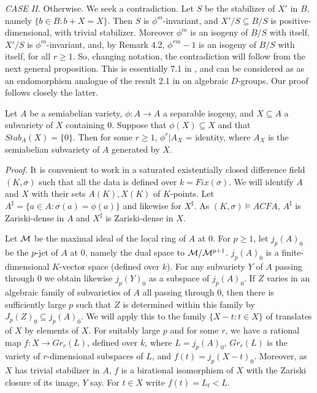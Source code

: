 \vspace{2mm}
\noindent
{\em CASE II.} Otherwise.
\newline
We seek a contradiction. Let $S$ be the
stabilizer of $X'$ in $B$, namely $\{b\in B:
b+X = X\}$. Then $S$ is $\phi^{m}$-invariant,
and $X'/S \subseteq B/S$ is
positive-dimensional, with trivial stabilizer.
Moreover $\phi^{m}$ is an isogeny of $B/S$
with itself, $X'/S$ is $\phi^{m}$-invariant,
and, by Remark 4.2, $\phi^{rm}-1$ is an
isogeny of $B/S$ with itself, for all $r\geq
1$. So, changing notation, the contradiction
will follow from the next  general
proposition. This is essentially 7.1 in
\cite{Pink-Roessler2}, and can be considered as
as an endomorphism analogue of the result 2.1
in \cite{Pillay} on algebraic $D$-groups. Our
proof follows closely the latter.
\begin{Proposition} Let $A$ be a semiabelian
variety, $\phi:A\rightarrow
A$ a separable isogeny, and
$X\subseteq A$ a subvariety of $X$
containing $0$. Suppose that $\phi(X)\subseteq
X$ and that $Stab_{A}(X) = \{0\}$. Then for
some $r\geq 1$, $\phi^{r}|A_{X}$ = identity,
where $A_{X}$ is the semiabelian subvariety of
$A$ generated by $X$.
\end{Proposition}
{\em Proof.} It is convenient to work in a
saturated existentially closed difference field
$(K,\sigma)$ such that all the data
is defined over $k = Fix(\sigma)$. We will
identify
$A$ and $X$ with their sets $A(K), X(K)$ of
$K$-points. Let
$A^{\sharp} = \{a\in A:\sigma(a)=\phi(a)\}$
and likewise for $X^{\sharp}$. As
$(K,\sigma)\models ACFA$, $A^{\sharp}$ is
Zariski-dense in $A$ and $X^{\sharp}$ is
Zariski-dense in $X$.

Let ${\cal M}$ be the maximal ideal of the
local ring of $A$ at $0$. For $p\geq 1$, let
$j_{p}(A)_{0}$ be the $p$-jet of $A$ at $0$,
namely the dual space to ${\cal M}/{\cal
M}^{p+1}$. $j_{p}(A)_{0}$ is a
finite-dimensional $K$-vector space (defined
over $k$). For any subvariety $Y$ of $A$
passing through
$0$ we obtain likewise $j_{p}(Y)_{0}$ as a
subspace of
$j_{p}(A)_{0}$. If $Z$ varies in an algebraic
family of subvarieties of $A$ all passing
through $0$, then there is sufficiently large
$p$ such that $Z$ is determined within this
family by $J_{p}(Z)_{0}\subseteq
j_{p}(A)_{0}$. We will apply this to the
family $\{X-t:t\in X\}$ of translates of $X$
by elements of $X$. For suitably large $p$ and
for some $r$, we have a rational map
$f:X\rightarrow Gr_{r}(L)$, defined over
$k$, where
$L = j_{p}(A)_{0}$, $Gr_{r}(L)$ is the variety
of $r$-dimensional subspaces of $L$, and $f(t)
= j_{p}(X-t)_{0}$. Moreover, as $X$ has
trivial stabilizer in $A$, $f$ is a birational
isomorphism of $X$ with the Zariski closure
of its image, $Y$ say. For $t\in X$ write
$f(t) = L_{t} < L$.

